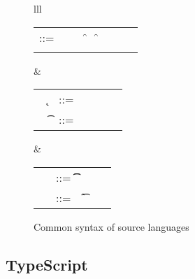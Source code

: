 \documentclass[acmlarge, anonymous, authordraft]{acmart}
\begin{document}
\begin{figure}[!h]\hrulefill
\hspace{2mm}

\begin{tabular}{lll}
\begin{minipage}{8cm}\begin{tabular}{@{}l@{~}l@{}l@{}l@{}l@{}l@{}l@{}l}
\e\hspace{.1cm} ::= & \hspace{.2cm} \x        
    &\B \this         
   &\B \FRead\f     
   &\B \FWrite\f\e   
   &\B \Call\e\m\e \\
   &
   &\B \that      
   &\B \New\C{\b\e}  
\end{tabular}\end{minipage}&
\begin{minipage}{2.9cm}\begin{tabular}{l@{~}l@{}l@{}ll}
   ~ \k &::= \Class \C {\b\fd}{\b\md} \\
~ \t&::= ~ \any  \B   \C  \B \src{\CW}  \\ 
\end{tabular}\end{minipage} &
\begin{minipage}{2.9cm}\begin{tabular}{l@{~}l@{}l@{}l}
\md &::= \Mdef\m\x\t\t\e \\
~\fd&::= ~ \Fdef\f\t \\ 
\end{tabular}\end{minipage}\end{tabular}

\hrulefill
\caption{Common syntax of source languages}\label{f:sourcesyntax}
\end{figure}




\subsection{TypeScript}
\end{document}
